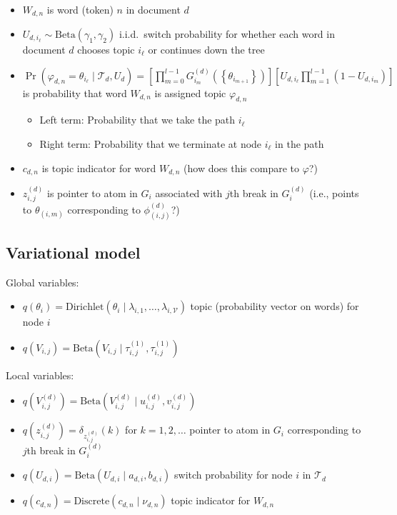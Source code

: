 \documentclass{article}
\newcommand{\Beta}{\ensuremath{\mathrm{Beta}}}
\newcommand{\Dirichlet}{\ensuremath{\mathrm{Dirichlet}}}
\newcommand{\Discrete}{\ensuremath{\mathrm{Discrete}}}
\newcommand{\T}{\ensuremath{\mathcal{T}}}
\newcommand{\V}{\ensuremath{\mathcal{V}}}
\begin{document}
\begin{itemize}
\begin{itemize}
\begin{align*}
        \end{align*}
    \end{itemize}
\item $W_{d,n}$ is word (token) $n$ in document $d$
\item $\displaystyle U_{d,i_\ell} \sim \Beta(\gamma_1, \gamma_2)$ i.i.d.\ switch probability for whether each word in document $d$ chooses topic $i_\ell$ or continues down the tree
\item $\displaystyle \Pr\left(\varphi_{d,n} = \theta_{i_\ell} \mid \T_d, U_d\right) = \left[\prod_{m=0}^{l-1}{G_{i_m}^{(d)}\left(\left\{\theta_{i_{m+1}}\right\}\right)}\right] \left[U_{d,i_\ell} \prod_{m=1}^{l-1}{\left(1 - U_{d,i_m}\right)}\right]$ is probability that word $W_{d,n}$ is assigned topic $\varphi_{d,n}$
    \begin{itemize}
    \item Left term: Probability that we take the path $i_\ell$
    \item Right term: Probability that we terminate at node $i_\ell$ in the path
    \end{itemize}
\item $c_{d,n}$ is topic indicator for word $W_{d,n}$ (how does this compare to $\varphi$?)
\item $z_{i,j}^{(d)}$ is pointer to atom in $G_i$ associated with $j$th break in $G_i^{(d)}$ (i.e., points to $\theta_{(i,m)}$ corresponding to $\phi_{(i,j)}^{(d)}$?)
\end{itemize}


\subsection*{Variational model}

Global variables:
\begin{itemize}
\item $\displaystyle q(\theta_i) = \Dirichlet(\theta_i \mid \lambda_{i,1}, \ldots, \lambda_{i,\V})$ topic (probability vector on words) for node $i$
\item $\displaystyle q(V_{i,j}) = \Beta(V_{i,j} \mid \tau_{i,j}^{(1)}, \tau_{i,j}^{(1)})$
\end{itemize}
Local variables:
\begin{itemize}
\item $\displaystyle q(V_{i,j}^{(d)}) = \Beta(V_{i,j}^{(d)} \mid u_{i,j}^{(d)}, v_{i,j}^{(d)})$
\item $\displaystyle q(z_{i,j}^{(d)}) = \delta_{z_{i,j}^{(d)}}(k)$ for $k = 1, 2, \ldots$ pointer to atom in $G_i$ corresponding to $j$th break in $G_i^{(d)}$
\item $\displaystyle q(U_{d,i}) = \Beta(U_{d,i} \mid a_{d,i}, b_{d,i})$ switch probability for node $i$ in $\T_d$
\item $\displaystyle q(c_{d,n}) = \Discrete(c_{d,n} \mid \nu_{d,n})$ topic indicator for $W_{d,n}$
\end{itemize}
\end{document}
